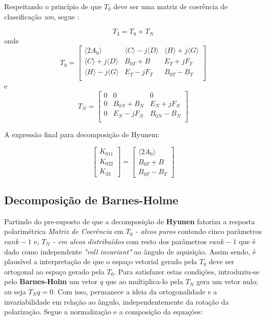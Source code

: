 \documentclass{article}
\begin{document}
Respeitando o princípio de que $T_{0}$ deve ser uma matriz de coerência de classificação \textit{um}, segue \cite{jong:2009}:

\begin{equation}
    T_{3} = T_{0} + T_{N}
\end{equation}
onde 
\begin{equation}
    T_{0} = 
        \begin{bmatrix}
        \langle2A_{0}\rangle & \langle C \rangle-j\langle D \rangle & \langle H \rangle+j\langle G \rangle\\
        \langle C \rangle+j\langle D \rangle & B_{0T}+B &  E_{T}+j F_{T}\\
        \langle H \rangle-j\langle G \rangle & E_{T}-j F_{T} &  B_{0T} - B_{T}\\
    \end{bmatrix}
\end{equation}
e
\begin{equation}
    T_{N} = 
        \begin{bmatrix}
        0 & 0 & 0\\
        0 & B_{0N}+B_{N} &  E_{N}+j F_{N}\\
        0 & E_{N}-j F_{N} &  B_{0N} - B_{N}\\
    \end{bmatrix}
\end{equation}

A expressão final para decomposição de Hyunem:

\begin{equation}
    \begin{bmatrix}
        K_{011} \\
	    K_{022}\\
	    K_{33}
    \end{bmatrix} = 
    \begin{bmatrix}
        \langle2A_{0}\rangle \\
	    B_{0T}+B \\
	    B_{0T} - B_{T}
    \end{bmatrix}
\end{equation}


\subsection{\textbf{Decomposição de Barnes-Holme}}

Partindo do pre-suposto de que a decomposição de \textbf{Hyunen} fatoriza a resposta polarimétrica \textit{Matriz de Coerência} em \textit{$T_{0}$ - alvos puros} contendo cinco parâmetros \textit{$rank - 1$} e, \textit{$T_{N}$ - em alvos distribuídos} com resto dos parâmetros \textit{$rank - 1$} que é dado como independente \textit{"roll invariant"} ao ângulo de aquisição. Assim sendo, é plausível a interpretação de que o espaço vetorial gerado pela \textit{$T_{0}$} deve ser ortogonal ao espaço gerado pela \textit{$T_{0}$}. Para satisfazer estas condições, introduziu-se pelo \textbf{Barnes-Holm} um vetor $q$ que ao multiplica-lo  pela $T_{N}$ gera um vetor nulo; ou seja $T_{N}q = 0$. Com isso, permanece a ideia da ortogonalidade e a invariabilidade em relação ao ângulo, independentemente da rotação da polarização. Segue a normalização e a composição da equações:
\end{document}
